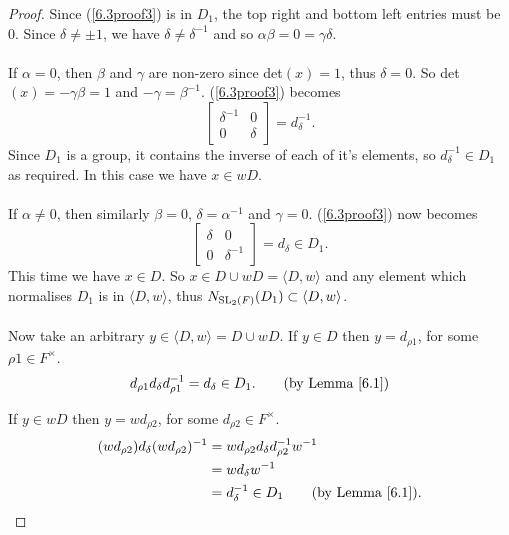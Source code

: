 \begin{proof}
Since (\ref{6.3proof3}) is in $D_1$, the top right and bottom left entries must be 0. Since  $\delta \neq \pm 1$, we have $\delta \neq \delta^{-1}$ and so $\alpha \beta = 0 = \gamma \delta$. \\
\\
 \space If $\alpha = 0$, then $\beta$ and $\gamma$ are non-zero since det$(x) = 1$, thus $\delta = 0$. So det$(x) = \minus \gamma \beta = 1$  and $\minus \gamma = \beta^{-1}$. (\ref{6.3proof3}) becomes $$\begin{bmatrix} \delta^{-1} & 0 \\ 0 & \delta \end{bmatrix} = d^{-1}_\delta.$$Since $D_1$ is a group, it contains the inverse of each of it's elements, so $d^{-1}_\delta \in D_1$ as required. In this case we have $x \in wD$. \\
\\
 \space If $\alpha \neq 0$, then similarly $\beta = 0$, $\delta = \alpha^{-1}$ and $\gamma = 0$. (\ref{6.3proof3}) now becomes $$\begin{bmatrix} \delta & 0 \\ 0 & \delta^{-1} \end{bmatrix} = d_\delta \in D_1.$$This time we have $x \in D$. So $x \in D \cup wD = \langle D , w \rangle$ and any element which normalises $D_1$ is in $\langle D , w \rangle$, thus $N_{\operatorname{SL}_2(F)}(D_1) \subset \langle D , w \rangle$. \\
\\
Now take an arbitrary $y \in \langle D , w \rangle = D \cup wD$. If $y \in D$ then $y = d_{\rho 1}$, for some $\rho 1 \in F^\times$.
\begin{align*} d_{\rho 1} d_\delta d^{-1}_{\rho 1} = d_\delta \in D_1. \tag{by Lemma \ref{6.1}}
\end{align*}

If $y \in wD$ then $y = w d_{\rho 2}$, for some $ d_{\rho 2} \in F^\times$.
\begin{align*} (w d_{\rho 2}) d_\delta (w d_{\rho 2})^{-1} &= w d_{\rho 2} d_\delta d^{-1}_{\rho 2} w^{-1}
\\ &= w d_\delta w^{-1}
\\ &= d^{-1}_\delta \in D_1 \tag{by Lemma \ref{6.1}}.
\end{align*}


\end{proof}
